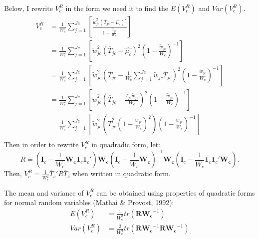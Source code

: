 Below, I rewrite $V^R_c $ in the form we need it to find the $ E(V^R_c)$ and $Var(V^R_c)$.
\begin{equation}
    \begin{split}
        V^R_c & = \frac{1}{W_c^2}  \sum_{j=1}^{Jc} \left[ \frac{\tilde{w}_{jc}^2 (\overline{T}_{jc} - \hat{\mu_c})^2}{1-\frac{\tilde{w}_{jc}}{W_c}} \right] \\
        & =  \frac{1}{W_c^2}  \sum_{j=1}^{Jc} \left[ \tilde{w}_{jc}^2 (\overline{T}_{jc} - \hat{\mu_c})^2 \left(1-\frac{\tilde{w}_{jc}}{W_c}\right)^{-1}  \right] \\
        & =  \frac{1}{W_c^2}  \sum_{j=1}^{Jc} \left[ \tilde{w}_{jc}^2 \left(\overline{T}_{jc} - \frac{1}{W_c}\sum_{j=1}^{Jc} \tilde{w}_{jc}\overline{T}_{jc}\right)^2 \left(1-\frac{\tilde{w}_{jc}}{W_c}\right)^{-1}  \right] \\
        & =  \frac{1}{W_c^2}  \sum_{j=1}^{Jc} \left[ \tilde{w}_{jc}^2 \left(\overline{T}_{jc} - \frac{\overline{T}_{jc} \tilde{w}_{jc}}{W_c}\right)^2 \left(1-\frac{\tilde{w}_{jc}}{W_c}\right)^{-1}  \right] \\
        & =  \frac{1}{W_c^2}  \sum_{j=1}^{Jc} \left[ \tilde{w}_{jc}^2 \left( \overline{T}_{jc}^2 \left(1- \frac{\tilde{w}_{jc}}{W_c}\right)^2 \right) \left(1-\frac{\tilde{w}_{jc}}{W_c}\right)^{-1}  \right] \\
    \end{split}
    \nonumber
\end{equation}
Then in order to rewrite $V^R_c$ in quadradic form, let:
\begin{equation}
   R = \left(\mathbf{I}_c - \frac{1}{W_c} \mathbf{W_c} \mathbf{1}_c\mathbf{1}_c' \right) \mathbf{W_c} \left(\mathbf{I}_c - \frac{1}{W_c} \mathbf{W_c} \right)^{-1} \mathbf{W_c} \left(\mathbf{I}_c - \frac{1}{W_c}  \mathbf{1}_c\mathbf{1}_c' \mathbf{W_c}\right).
   \nonumber
\end{equation}
Then, $V^R_c = \frac{1}{W_c^2} \overline{T}_c'R\overline{T}_c$ when written in quadratic form. 

The mean and variance of $V^R_c$ can be obtained using properties of quadratic forms for normal random variables (Mathai \& Provost, 1992):
\begin{equation}
    \begin{split}
        E(V^R_c) & = \frac{1}{W_c^2}tr(\mathbf{R}\mathbf{W_c}^{-1}) \\
        Var(V^R_c) & = \frac{2}{W^4_c} tr(\mathbf{R}\mathbf{W_c}^{-1}\mathbf{R}\mathbf{W_c}^{-1})
    \end{split}
    \nonumber
\end{equation}

